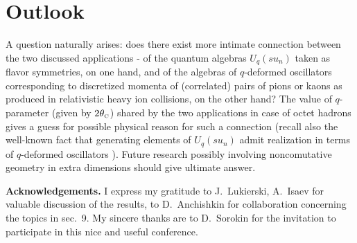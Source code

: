 \documentclass[twoside]{article}
\newcommand{\scr}{\rm\scriptscriptstyle}
\begin{document}
\section{Outlook}

A question naturally arises: does there exist
more intimate connection  between the two
discussed applications - of the quantum algebras $U_q(su_n)$
taken as flavor symmetries, on one hand, and of the algebras
of $q$-deformed oscillators corresponding to discretized momenta
of (correlated) pairs of pions or kaons as produced in
relativistic heavy ion collisions, on the other hand?
The value of $q$-parameter (given by $2 \theta_{\scr C}$)
shared by the two applications in case of octet hadrons
gives a guess for possible physical reason for such a connection
(recall also the well-known fact that generating elements of
$U_q(su_n)$ admit realization in terms of $q$-deformed
oscillators  \cite{BM}).
  Future research possibly involving noncomutative geometry in extra
dimensions should give ultimate answer.


\vspace{1.2mm}
{\bf Acknowledgements.} I express my gratitude to
J.~Lukierski, A.~Isaev for valuable discussion of the results,
to D.~Anchishkin for collaboration concerning the topics in sec.~9.
My sincere thanks are to D.~Sorokin for the invitation
to participate in this nice and useful conference.


\end{document}
